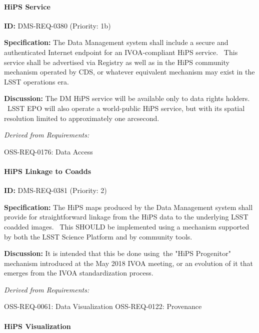 \documentclass[SE,toc,lsstdraft]{lsstdoc}
\begin{document}
\paragraph{HiPS Service}\hfill  %

\label{DMS-REQ-0380}
\textbf{ID:} DMS-REQ-0380 (Priority: 1b)

\textbf{Specification:}
The Data Management system shall include a secure and authenticated Internet endpoint for an IVOA-compliant HiPS service.  This service shall be advertised via Registry as well as in the HiPS community mechanism operated by CDS, or whatever equivalent mechanism may exist in the LSST operations era.

\textbf{Discussion:}
The DM HiPS service will be available only to data rights holders.  LSST EPO will also operate a world-public HiPS service, but with its spatial resolution limited to approximately one arcsecond.

\emph{Derived from Requirements:}

OSS-REQ-0176:
Data Access \newline

\paragraph{HiPS Linkage to Coadds}\hfill  %

\label{DMS-REQ-0381}
\textbf{ID:} DMS-REQ-0381 (Priority: 2)

\textbf{Specification:}
The HiPS maps produced by the Data Management system shall provide for straightforward linkage from the HiPS data to the underlying LSST coadded images.  This SHOULD be implemented using a mechanism supported by both the LSST Science Platform and by community tools.

\textbf{Discussion:}
It is intended that this be done using the "HiPS Progenitor" mechanism introduced at the May 2018 IVOA meeting, or an evolution of it that emerges from the IVOA standardization process.

\emph{Derived from Requirements:}

OSS-REQ-0061:
Data Visualization \newline
OSS-REQ-0122:
Provenance \newline

\paragraph{HiPS Visualization}\hfill  %
\end{document}
